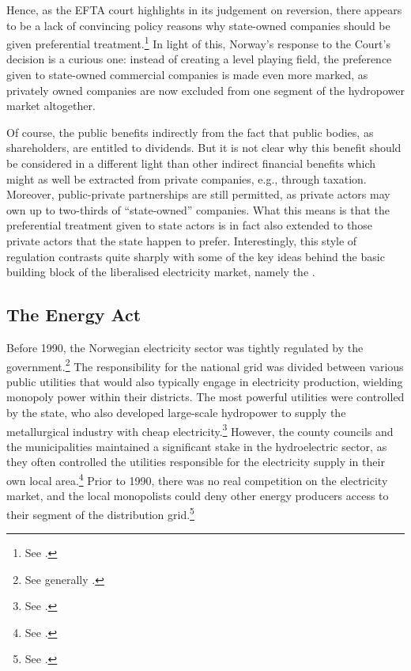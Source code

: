 Hence, as the EFTA court highlights in its judgement on reversion, there appears to be a lack of convincing policy reasons why state-owned companies should be given preferential treatment.\footnote{See \cite[84-87]{efta07}.} In light of this, Norway's response to the Court's decision is a curious one: instead of creating a level playing field, the preference given to state-owned commercial companies is made even more marked, as privately owned companies are now excluded from one segment of the hydropower market altogether.

Of course, the public benefits indirectly from the fact that public bodies, as shareholders, are entitled to dividends. But it is not clear why this benefit should be considered in a different light than other indirect financial benefits which might as well be extracted from private companies, e.g., through taxation. Moreover, public-private partnerships are still permitted, as private actors may own up to two-thirds of ``state-owned'' companies. What this means is that the preferential treatment given to state actors is in fact also extended to those private actors that the state happen to prefer. Interestingly, this style of regulation contrasts quite sharply with some of the key ideas behind the basic building block of the liberalised electricity market, namely the \cite{ea90}.

\subsection{The Energy Act}\label{sec:ea}

Before 1990, the Norwegian electricity sector was tightly regulated by the government.\footnote{See generally \cite{bye05,skjold07}.} The responsibility for the national grid was divided between various public utilities that would also typically engage in electricity production, wielding monopoly power within their districts. The most powerful utilities were controlled by the state, who also developed large-scale hydropower to supply the metallurgical industry with cheap electricity.\footnote{See \cite[67-71]{thue96}.} However, the county councils and the municipalities maintained a significant stake in the hydroelectric sector, as they often controlled the utilities responsible for the electricity supply in their own local area.\footnote{See \cite[85]{thue96}.} 
Prior to 1990, there was no real competition on the electricity market, and the local monopolists could deny other energy producers access to their segment of the distribution grid.\footnote{See \cite[83-84]{uleberg08}.}

